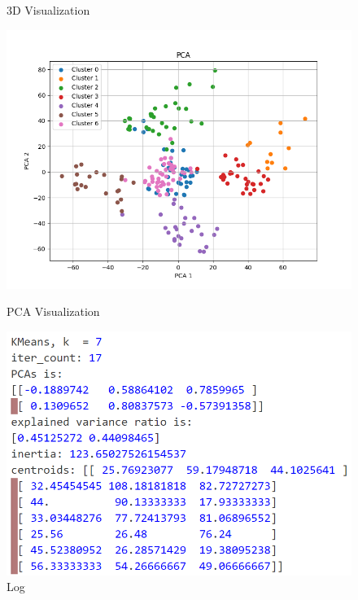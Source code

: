 \documentclass[8pt]{article}
\begin{document}
\begin{figure}[H]
\begin{minipage}{0.32\textwidth}
        \caption{3D Visualization}
        \label{fig: 3D Visualization k7 rand14}
    \end{minipage}
    \hfill
    \begin{minipage}{0.32\textwidth}
        \centering
        \includegraphics[width=\textwidth]{./Prob4/out/task1_rand14/images/PCA_k7.png}
        \caption{PCA Visualization}
        \label{fig: PCA Visualization k7 rand14}
    \end{minipage}
    \hfill
    \begin{minipage}{0.32\textwidth}
        \centering
        \includegraphics[width=\textwidth]{./Prob4/out/task1_rand14/log_k7.png}
        \caption{Log}
        \label{fig: log_k7.png rand14}
    \end{minipage}
\end{figure}
\end{document}
